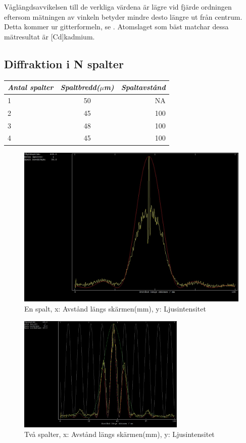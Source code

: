 \documentclass[conference]{IEEEtran}
\begin{document}
Våglängdsavvikelsen till de verkliga värdena är lägre vid fjärde ordningen eftersom mätningen av vinkeln betyder mindre desto längre ut från centrum. Detta kommer ur gitterformeln, se \cite{Handledningen}. Atomslaget som bäst matchar dessa mätresultat är [Cd]kadmium. 

\subsection{\textbf{Diffraktion i N spalter}}
\begin{tabular}{|l|c|r|} \hline
\emph{Antal spalter} & \emph{Spaltbredd($\mu$m)}  & \emph{Spaltavstånd}\\ \hline
1 & 50 & NA\\ \hline
2 & 45 & 100\\ \hline
3 & 48 & 100\\ \hline
4 & 45 & 100\\ \hline
\end{tabular} \vspace{5pt}

\begin{figure}[H]
    \begin{center}
        \includegraphics[width = 8 cm]{first.jpg}
    \end{center}
    \caption{En spalt, x: Avstånd längs skärmen(mm), y: Ljusintensitet}
    \label{1 spalt}
\end{figure} \vspace{3pt}

\begin{figure}[H]
    \begin{center}
        \includegraphics[width = 8cm]{Andra.jpg}
    \end{center}
    \caption{Två spalter, x: Avstånd längs skärmen(mm), y: Ljusintensitet}
    \label{2 spalter}
\end{figure} \vspace{3pt}
\end{document}
